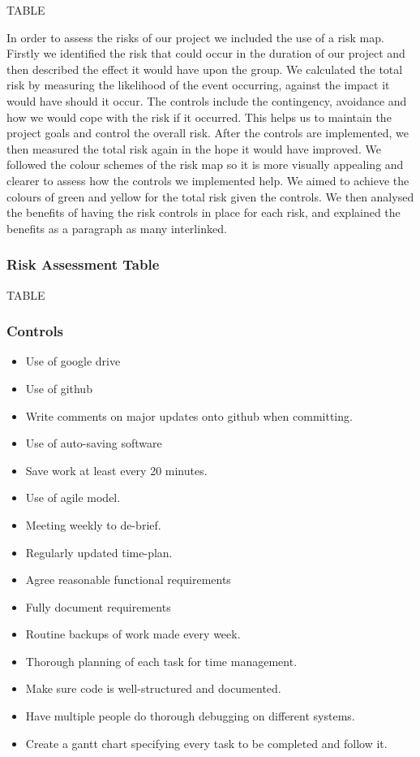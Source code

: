\documentclass[12pt]{article}
\begin{document}
    
    TABLE
    
     In order to assess the risks of our project we included the use of a risk map. Firstly we identified the risk that could occur in the duration of our project and then described the effect it would have upon the group. We calculated the total risk by measuring the likelihood of the event occurring, against the impact it would have should it occur. The controls include the contingency, avoidance and how we would cope with the risk if it occurred. This helps us to maintain the project goals and control the overall risk. After the controls are implemented, we then measured the total risk again in the hope it would have improved. We followed the colour schemes of the risk map so it is more visually appealing and clearer to assess how the controls we implemented help. We aimed to achieve the colours of green and yellow for the total risk given the controls. We then analysed the benefits of having the risk controls in place for each risk, and explained the benefits as a paragraph as many interlinked.
     
     
     \subsubsection{Risk Assessment Table}
     
     TABLE
     
     \subsubsection{Controls}
    \begin{itemize}
    
\item Use of google drive
\item Use of github
\item Write comments on major updates onto github when committing.
\item Use of auto-saving software
\item Save work at least every 20 minutes.
\item Use of agile model.
\item Meeting weekly to de-brief.
\item Regularly updated time-plan.
\item Agree reasonable functional requirements
\item Fully document requirements
\item Routine backups of work made every week.
\item Thorough planning of each task for time management.
\item Make sure code is well-structured and documented.
\item Have multiple people do thorough debugging on different systems.
\item Create a gantt chart specifying every task to be completed and follow it. 
\end{itemize}
\end{document}
